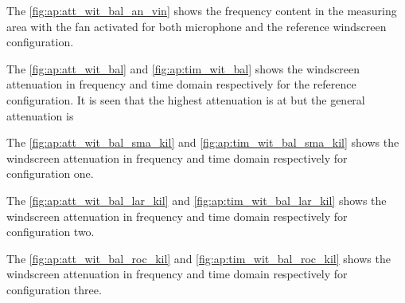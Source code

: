 The \autoref{fig:ap:att_wit_bal_an_vin} shows the frequency content in the measuring area with the fan activated for both microphone and the reference windscreen configuration. 



The \autoref{fig:ap:att_wit_bal} and \autoref{fig:ap:tim_wit_bal} shows the windscreen attenuation in frequency and time domain respectively for the reference configuration. It is seen that the highest attenuation is at  but the general attenuation is 




The \autoref{fig:ap:att_wit_bal_sma_kil} and \autoref{fig:ap:tim_wit_bal_sma_kil} shows the windscreen attenuation in frequency and time domain respectively for configuration one. 





The \autoref{fig:ap:att_wit_bal_lar_kil} and \autoref{fig:ap:tim_wit_bal_lar_kil} shows the windscreen attenuation in frequency and time domain respectively for configuration two.




The \autoref{fig:ap:att_wit_bal_roc_kil} and \autoref{fig:ap:tim_wit_bal_roc_kil} shows the windscreen attenuation in frequency and time domain respectively for configuration three.


